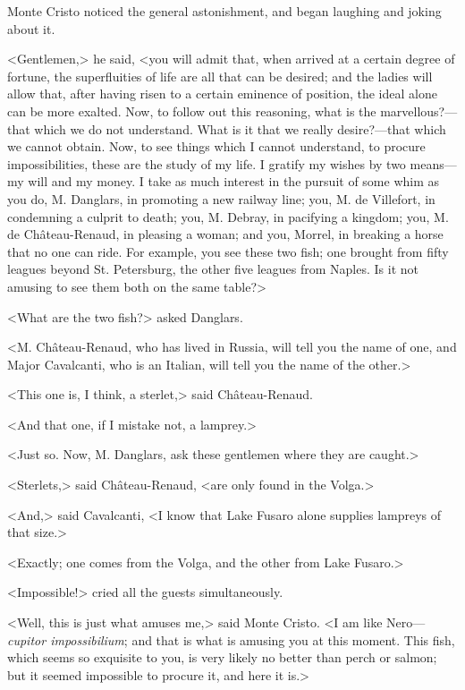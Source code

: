  Monte Cristo noticed the general astonishment, and began laughing and joking about it. 

 <Gentlemen,> he said, <you will admit that, when arrived at a certain degree of fortune, the superfluities of life are all that can be desired; and the ladies will allow that, after having risen to a certain eminence of position, the ideal alone can be more exalted. Now, to follow out this reasoning, what is the marvellous?—that which we do not understand. What is it that we really desire?—that which we cannot obtain. Now, to see things which I cannot understand, to procure impossibilities, these are the study of my life. I gratify my wishes by two means—my will and my money. I take as much interest in the pursuit of some whim as you do, M. Danglars, in promoting a new railway line; you, M. de Villefort, in condemning a culprit to death; you, M. Debray, in pacifying a kingdom; you, M. de Château-Renaud, in pleasing a woman; and you, Morrel, in breaking a horse that no one can ride. For example, you see these two fish; one brought from fifty leagues beyond St. Petersburg, the other five leagues from Naples. Is it not amusing to see them both on the same table?> 

 <What are the two fish?> asked Danglars. 

 <M. Château-Renaud, who has lived in Russia, will tell you the name of one, and Major Cavalcanti, who is an Italian, will tell you the name of the other.> 

 <This one is, I think, a sterlet,> said Château-Renaud. 

 <And that one, if I mistake not, a lamprey.> 

 <Just so. Now, M. Danglars, ask these gentlemen where they are caught.> 

 <Sterlets,> said Château-Renaud, <are only found in the Volga.> 

 <And,> said Cavalcanti, <I know that Lake Fusaro alone supplies lampreys of that size.> 

 <Exactly; one comes from the Volga, and the other from Lake Fusaro.> 

 <Impossible!> cried all the guests simultaneously. 

 <Well, this is just what amuses me,> said Monte Cristo. <I am like Nero—\textit{cupitor impossibilium}; and that is what is amusing you at this moment. This fish, which seems so exquisite to you, is very likely no better than perch or salmon; but it seemed impossible to procure it, and here it is.> 

